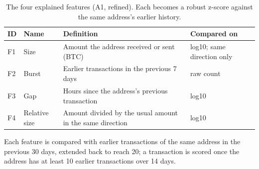\begin{table}[htbp]
\centering
\small
\caption{The four explained features (A1, refined). Each becomes a robust z-score against the same address's earlier history.}
\label{tab:features}
\begin{tabularx}{\textwidth}{@{}l l Y l@{}}
\toprule
ID & Name & Definition & Compared on \\
\midrule
F1 & Size & Amount the address received or sent (BTC) & log10; same direction only \\
F2 & Burst & Earlier transactions in the previous 7 days & raw count \\
F3 & Gap & Hours since the address's previous transaction & log10 \\
F4 & Relative size & Amount divided by the usual amount in the same direction & log10 \\
\bottomrule
\end{tabularx}
\par\smallskip\parbox{\textwidth}{\footnotesize Each feature is compared with earlier transactions of the same address in the previous 30 days, extended back to reach 20; a transaction is scored once the address has at least 10 earlier transactions over 14 days.}
\end{table}

